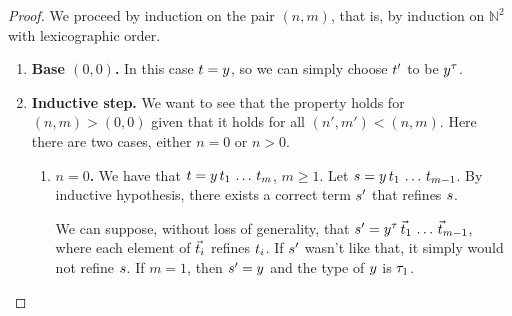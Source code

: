 \begin{proof}
We proceed by induction on the pair $(n, m)$, that is, by induction on
  $\mathbb{N}^2$ with lexicographic order.
\begin{enumerate}
  \item {\bf Base $(0, 0)$.} In this case $t = y$,
    so we can simply choose $t'$ to be $y^\tau$.
  \item {\bf Inductive step.} We want to see that the property holds for
    $(n, m) > (0,0)$ given that it holds for all $(n', m') < (n, m)$.
    Here there are two cases, either $n = 0$ or $n > 0$.
    \begin{enumerate}
      \item {\bf $n = 0$.} We have that $t = y\,t_1\,\hdots\,t_m$, $m \geq 1$.
        Let $s = y\,t_1\,\hdots\,t_{m-1}$.
        By inductive hypothesis, there exists a correct term $s'$ that
          refines $s$.

        We can suppose, without loss of generality, that
          $s' = y^\tau\,\vec{t}_1\,\hdots\,\vec{t}_{m-1}$,
        where each element of $\vec{t}_i$ refines $t_i$.
        If $s'$ wasn't like that, it simply would not refine $s$.
        If $m = 1$, then $s' = y$ and the type of $y$ is $\tau_1$.


\end{enumerate}
\end{enumerate}
\end{proof}
